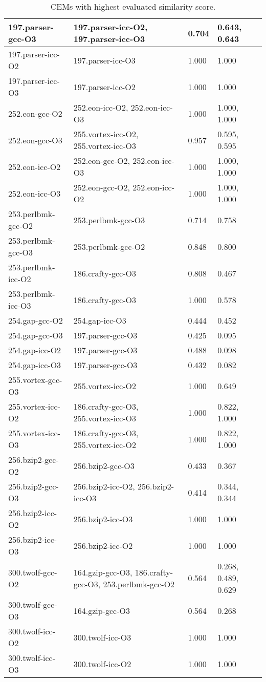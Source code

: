 \begin{table}
\begin{tabular}{|p{1.5in}|p{1.5in}|p{0.5in}|p{1.0in}|}
\hline
    197.parser-gcc-O3&197.parser-icc-O2, 197.parser-icc-O3&0.704&0.643, 0.643\\
\hline
    197.parser-icc-O2&197.parser-icc-O3&1.000&1.000\\
\hline
    197.parser-icc-O3&197.parser-icc-O2&1.000&1.000\\
\hline
    252.eon-gcc-O2&252.eon-icc-O2, 252.eon-icc-O3&1.000&1.000, 1.000\\
\hline
    252.eon-gcc-O3&255.vortex-icc-O2, 255.vortex-icc-O3&0.957&0.595, 0.595\\
\hline
    252.eon-icc-O2&252.eon-gcc-O2, 252.eon-icc-O3&1.000&1.000, 1.000\\
\hline
    252.eon-icc-O3&252.eon-gcc-O2, 252.eon-icc-O2&1.000&1.000, 1.000\\
\hline
    253.perlbmk-gcc-O2&253.perlbmk-gcc-O3&0.714&0.758\\
\hline
    253.perlbmk-gcc-O3&253.perlbmk-gcc-O2&0.848&0.800\\
\hline
    253.perlbmk-icc-O2&186.crafty-gcc-O3&0.808&0.467\\
\hline
    253.perlbmk-icc-O3&186.crafty-gcc-O3&1.000&0.578\\
\hline
    254.gap-gcc-O2&254.gap-icc-O3&0.444&0.452\\
\hline
    254.gap-gcc-O3&197.parser-gcc-O3&0.425&0.095\\
\hline
    254.gap-icc-O2&197.parser-gcc-O3&0.488&0.098\\
\hline
    254.gap-icc-O3&197.parser-gcc-O3&0.432&0.082\\
\hline
    255.vortex-gcc-O3&255.vortex-icc-O2&1.000&0.649\\
\hline
    255.vortex-icc-O2&186.crafty-gcc-O3, 255.vortex-icc-O3&1.000&0.822, 1.000\\
\hline
    255.vortex-icc-O3&186.crafty-gcc-O3, 255.vortex-icc-O2&1.000&0.822, 1.000\\
\hline
    256.bzip2-gcc-O2&256.bzip2-gcc-O3&0.433&0.367\\
\hline
    256.bzip2-gcc-O3&256.bzip2-icc-O2, 256.bzip2-icc-O3&0.414&0.344, 0.344\\
\hline
    256.bzip2-icc-O2&256.bzip2-icc-O3&1.000&1.000\\
\hline
    256.bzip2-icc-O3&256.bzip2-icc-O2&1.000&1.000\\
\hline
    300.twolf-gcc-O2&164.gzip-gcc-O3, 186.crafty-gcc-O3, 253.perlbmk-gcc-O2&0.564&0.268, 0.489, 0.629\\
\hline
    300.twolf-gcc-O3&164.gzip-gcc-O3&0.564&0.268\\
\hline
    300.twolf-icc-O2&300.twolf-icc-O3&1.000&1.000\\
\hline
    300.twolf-icc-O3&300.twolf-icc-O2&1.000&1.000\\
\hline
\end{tabular}
\caption{CEMs with highest evaluated similarity score.}
\label{table:graph_sim}
\end{table}

